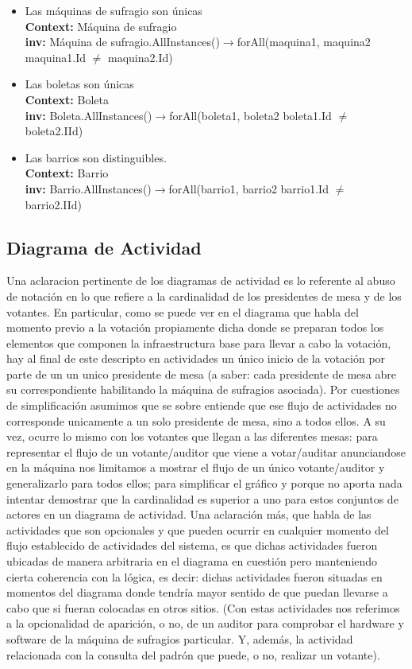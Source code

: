 \documentclass[spanish, 10pt,a4paper]{article}
\numberwithin{equation}{section} %
\begin{document}
\begin{itemize}
	\item Las máquinas de sufragio son únicas
\\	\textbf{Context: }  Máquina de sufragio
\\	\textbf{inv: } Máquina de sufragio.AllInstances()$\rightarrow$forAll(maquina1, maquina2 \textbar maquina1.Id $\neq$ maquina2.Id)

	\item Las boletas son únicas
\\	\textbf{Context: }  Boleta
\\	\textbf{inv: } Boleta.AllInstances()$\rightarrow$forAll(boleta1, boleta2 \textbar boleta1.Id $\neq$ boleta2.IId)

	\item Las barrios son distinguibles.
\\	\textbf{Context: }  Barrio
\\	\textbf{inv: } Barrio.AllInstances()$\rightarrow$forAll(barrio1, barrio2 \textbar barrio1.Id $\neq$ barrio2.IId)
\end{itemize}

\subsection{Diagrama de Actividad}
Una aclaracion pertinente de los diagramas de actividad es lo referente al abuso de notación en lo que refiere a la cardinalidad de los presidentes de mesa y de los votantes. En particular, como se puede ver en el diagrama que habla del momento previo a la votaci\'on propiamente dicha donde se preparan todos los elementos que componen la infraestructura base para llevar a cabo la votaci\'on, hay al final de este descripto en actividades un \'unico inicio de la votaci\'on por parte de un un unico presidente de mesa (a saber: cada presidente de mesa abre su correspondiente habilitando la m\'aquina de sufragios asociada). Por cuestiones de simplificaci\'on asumimos que se sobre entiende que ese flujo de actividades no corresponde unicamente a un solo presidente de mesa, sino a todos ellos.
A su vez, ocurre lo mismo con los votantes que llegan a las diferentes mesas: para representar el flujo de un votante/auditor que viene a votar/auditar anunciandose en la m\'aquina nos limitamos a mostrar el flujo de un \'unico votante/auditor y generalizarlo para todos ellos; para simplificar el gr\'afico y porque no aporta nada intentar demostrar que la cardinalidad es superior a uno para estos conjuntos de actores en un diagrama de actividad. 
Una aclaraci\'on m\'as, que habla de las actividades que son opcionales y que pueden ocurrir en cualquier momento del flujo establecido de actividades del sistema, es que dichas actividades fueron ubicadas de manera arbitraria en el diagrama en cuesti\'on pero manteniendo cierta coherencia con la l\'ogica, es decir: dichas actividades fueron situadas en momentos del diagrama donde tendr\'ia mayor sentido de que puedan llevarse a cabo que si fueran colocadas en otros sitios. (Con estas actividades nos referimos a la opcionalidad de aparici\'on, o no, de un auditor para comprobar el hardware y software de la m\'aquina de sufragios particular. Y, adem\'as, la actividad relacionada con la consulta del padr\'on que puede, o no, realizar un votante).
\end{document}
